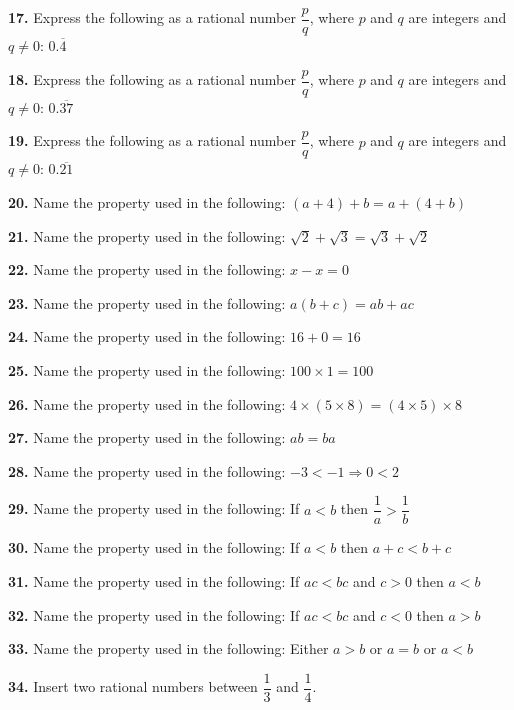 \documentclass[11pt]{article}
\begin{document}
\bigskip
\noindent\textbf{17.} Express the following as a rational number $\dfrac{p}{q}$, where $p$ and $q$ are integers and $q\neq0$: $0.\overline{4}$

\bigskip
\noindent\textbf{18.} Express the following as a rational number $\dfrac{p}{q}$, where $p$ and $q$ are integers and $q\neq0$: $0.\overline{37}$

\bigskip
\noindent\textbf{19.} Express the following as a rational number $\dfrac{p}{q}$, where $p$ and $q$ are integers and $q\neq0$: $0.\overline{21}$

\bigskip
\noindent\textbf{20.} Name the property used in the following: $(a+4)+b = a+(4+b)$

\bigskip
\noindent\textbf{21.} Name the property used in the following: $\sqrt{2}+\sqrt{3} = \sqrt{3}+\sqrt{2}$

\bigskip
\noindent\textbf{22.} Name the property used in the following: $x-x=0$

\bigskip
\noindent\textbf{23.} Name the property used in the following: $a(b+c)=ab+ac$

\bigskip
\noindent\textbf{24.} Name the property used in the following: $16+0=16$

\bigskip
\noindent\textbf{25.} Name the property used in the following: $100\times1=100$

\bigskip
\noindent\textbf{26.} Name the property used in the following: $4\times(5\times8)=(4\times5)\times8$

\bigskip
\noindent\textbf{27.} Name the property used in the following: $ab=ba$

\bigskip
\noindent\textbf{28.} Name the property used in the following: $-3<-1 \Rightarrow 0<2$

\bigskip
\noindent\textbf{29.} Name the property used in the following: If $a<b$ then $\dfrac{1}{a}>\dfrac{1}{b}$

\bigskip
\noindent\textbf{30.} Name the property used in the following: If $a<b$ then $a+c<b+c$

\bigskip
\noindent\textbf{31.} Name the property used in the following: If $ac<bc$ and $c>0$ then $a<b$

\bigskip
\noindent\textbf{32.} Name the property used in the following: If $ac<bc$ and $c<0$ then $a>b$

\bigskip
\noindent\textbf{33.} Name the property used in the following: Either $a>b$ or $a=b$ or $a<b$

\bigskip
\noindent\textbf{34.} Insert two rational numbers between $\dfrac{1}{3}$ and $\dfrac{1}{4}$.
\end{document}
